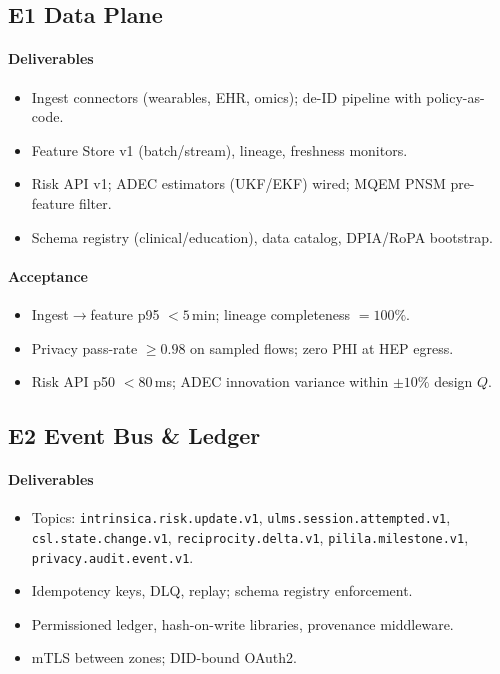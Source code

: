 \documentclass[11pt]{article}
\theoremstyle{plain}
\begin{document}
\subsection{E1 Data Plane}
\paragraph{Deliverables}
\begin{itemize}
  \item Ingest connectors (wearables, EHR, omics); de-ID pipeline with policy-as-code.
  \item Feature Store v1 (batch/stream), lineage, freshness monitors.
  \item Risk API v1; ADEC estimators (UKF/EKF) wired; MQEM PNSM pre-feature filter.
  \item Schema registry (clinical/education), data catalog, DPIA/RoPA bootstrap.
\end{itemize}
\paragraph{Acceptance}
\begin{itemize}
  \item Ingest$\rightarrow$feature p95 $<5$\,min; lineage completeness $=100\%$.
  \item Privacy pass-rate $\ge 0.98$ on sampled flows; zero PHI at HEP egress.
  \item Risk API p50 $<80$\,ms; ADEC innovation variance within $\pm10\%$ design $Q$.
\end{itemize}

\subsection{E2 Event Bus \& Ledger}
\paragraph{Deliverables}
\begin{itemize}
  \item Topics: \texttt{intrinsica.risk.update.v1}, \texttt{ulms.session.attempted.v1}, \texttt{csl.state.change.v1}, \texttt{reciprocity.delta.v1}, \texttt{pilila.milestone.v1}, \texttt{privacy.audit.event.v1}.
  \item Idempotency keys, DLQ, replay; schema registry enforcement.
  \item Permissioned ledger, hash-on-write libraries, provenance middleware.
  \item mTLS between zones; DID-bound OAuth2.
\end{itemize}
\end{document}
